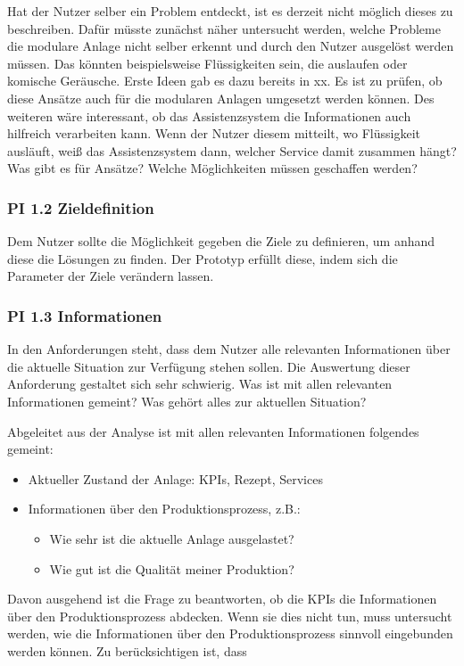 Hat der Nutzer selber ein Problem entdeckt, ist es derzeit nicht möglich dieses zu beschreiben. Dafür müsste zunächst näher untersucht werden, welche Probleme die modulare Anlage nicht selber erkennt und durch den Nutzer ausgelöst werden müssen. Das könnten beispielsweise Flüssigkeiten sein, die auslaufen oder komische Geräusche. Erste Ideen gab es dazu bereits in xx. Es ist zu prüfen, ob diese Ansätze auch für die modularen Anlagen umgesetzt werden können. Des weiteren wäre interessant, ob das Assistenzsystem die Informationen auch hilfreich verarbeiten kann. Wenn der Nutzer diesem mitteilt, wo Flüssigkeit ausläuft, weiß das Assistenzsystem dann, welcher Service damit zusammen hängt?
Was gibt es für Ansätze?
Welche Möglichkeiten müssen geschaffen werden?

\subsubsection*{PI 1.2 Zieldefinition}
Dem Nutzer sollte die Möglichkeit gegeben die Ziele zu definieren, um anhand diese die Lösungen zu finden. Der Prototyp erfüllt diese, indem sich die Parameter der Ziele verändern lassen.

\subsubsection*{PI 1.3 Informationen}
In den Anforderungen steht, dass dem Nutzer alle relevanten Informationen über die aktuelle Situation zur Verfügung stehen sollen. Die Auswertung dieser Anforderung gestaltet sich sehr schwierig. Was ist mit allen relevanten Informationen gemeint? Was gehört alles zur aktuellen Situation? 

Abgeleitet aus der Analyse ist mit allen relevanten Informationen folgendes gemeint:
\begin{itemize}
\item Aktueller Zustand der Anlage: KPIs, Rezept, Services
\item Informationen über den Produktionsprozess, z.B.:
	\begin{itemize}
	\item Wie sehr ist die aktuelle Anlage ausgelastet?
	\item Wie gut ist die Qualität meiner Produktion?
\end{itemize}
\end{itemize}
Davon ausgehend ist die Frage zu beantworten, ob die KPIs die Informationen über den Produktionsprozess abdecken. Wenn sie dies nicht tun, muss untersucht werden, wie die Informationen über den Produktionsprozess sinnvoll eingebunden werden können. Zu berücksichtigen ist, dass  

